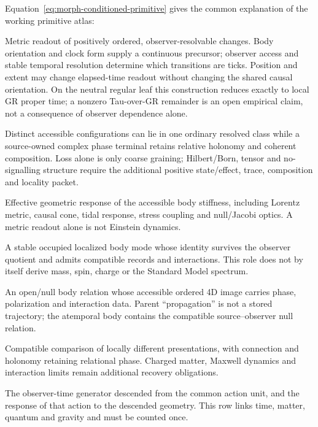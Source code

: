 \documentclass[11pt]{article}
\begin{document}
Equation~\eqref{eq:morph-conditioned-primitive} gives the common explanation
of the working primitive atlas:
\begin{description}[style=nextline,leftmargin=0pt]
 \item[Time.]
 Metric readout of positively ordered, observer-resolvable changes. Body
 orientation and clock form supply a continuous precursor; observer access
 and stable temporal resolution determine which transitions are ticks.
 Position and extent may change elapsed-time readout without changing the
 shared causal orientation. On the neutral regular leaf this construction
 reduces exactly to local GR proper time; a nonzero Tau-over-GR remainder is
 an open empirical claim, not a consequence of observer dependence alone.
 \item[Quantum.]
 Distinct accessible configurations can lie in one ordinary resolved class
 while a source-owned complex phase terminal retains relative holonomy and
 coherent composition. Loss alone is only coarse graining; Hilbert/Born,
 tensor and no-signalling structure require the additional positive
 state/effect, trace, composition and locality packet.
 \item[Gravity and geometry.]
 Effective geometric response of the accessible body stiffness, including
 Lorentz metric, causal cone, tidal response, stress coupling and null/Jacobi
 optics. A metric readout alone is not Einstein dynamics.
 \item[Matter.]
 A stable occupied localized body mode whose identity survives the observer
 quotient and admits compatible records and interactions. This role does not
 by itself derive mass, spin, charge or the Standard Model spectrum.
 \item[Radiation and photon.]
 An open/null body relation whose accessible ordered 4D image carries phase,
 polarization and interaction data. Parent ``propagation'' is not a stored
 trajectory; the atemporal body contains the compatible source--observer
 null relation.
 \item[Gauge and electromagnetic structure.]
 Compatible comparison of locally different presentations, with connection
 and holonomy retaining relational phase. Charged matter, Maxwell dynamics
 and interaction limits remain additional recovery obligations.
 \item[Energy and stress.]
 The observer-time generator descended from the common action unit, and the
 response of that action to the descended geometry. This row links time,
 matter, quantum and gravity and must be counted once.
\end{description}
\end{document}
